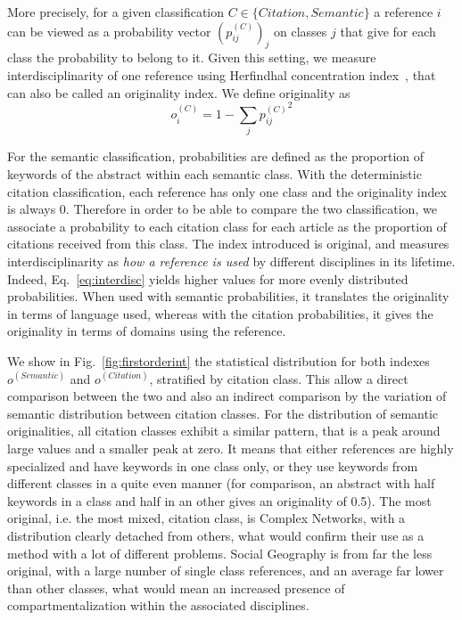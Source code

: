 \documentclass[10pt]{article}
\begin{document}
More precisely, for a given classification $C \in \{ Citation,Semantic\}$ a reference $i$ can be viewed as a probability vector $(p_{ij}^{(C)})_j$ on classes $j$ that give for each class the probability to belong to it. Given this setting, we measure interdisciplinarity of one reference using Herfindhal concentration index~\citep{porter2009science}, that can also be called an originality index. We define originality as
\begin{equation}
o_i^{(C)} = 1 - \sum_j {p_{ij}^{(C)}}^2
\label{eq:interdisc}
\end{equation}

For the semantic classification, probabilities are defined as the proportion of keywords of the abstract within each semantic class. With the deterministic citation classification, each reference has only one class and the originality index is always 0. Therefore in order to be able to compare the two classification, we associate a probability to each citation class for each article as the proportion of citations received from this class. The index introduced is original, and measures interdisciplinarity as \emph{how a reference is used} by different disciplines in its lifetime. Indeed, Eq.~\ref{eq:interdisc} yields higher values for more evenly distributed probabilities. When used with semantic probabilities, it translates the originality in terms of language used, whereas with the citation probabilities, it gives the originality in terms of domains using the reference.


We show in Fig.~\ref{fig:firstorderint} the statistical distribution for both indexes $o^{(Semantic)}$ and $o^{(Citation)}$, stratified by citation class. This allow a direct comparison between the two and also an indirect comparison by the variation of semantic distribution between citation classes. For the distribution of semantic originalities, all citation classes exhibit a similar pattern, that is a peak around large values and a smaller peak at zero. It means that either references are highly specialized and have keywords in one class only, or they use keywords from different classes in a quite even manner (for comparison, an abstract with half keywords in a class and half in an other gives an originality of 0.5). The most original, i.e. the most mixed, citation class, is Complex Networks, with a distribution clearly detached from others, what would confirm their use as a method with a lot of different problems. Social Geography is from far the less original, with a large number of single class references, and an average far lower than other classes, what would mean an increased presence of compartmentalization within the associated disciplines.
\end{document}
